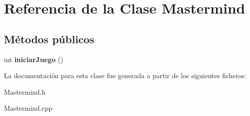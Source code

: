 \hypertarget{classMastermind}{\section{Referencia de la Clase Mastermind}
\label{classMastermind}
}
\subsection*{Métodos públicos}
\begin{DoxyCompactItemize}
\item 
\hypertarget{classMastermind_ab85ee5d13e86bb1a83f9e7f39c2240b8}{int {\bfseries iniciar\-Juego} ()}\label{classMastermind_ab85ee5d13e86bb1a83f9e7f39c2240b8}

\end{DoxyCompactItemize}


La documentación para esta clase fue generada a partir de los siguientes ficheros\-:\begin{DoxyCompactItemize}
\item 
Mastermind.\-h\item 
Mastermind.\-cpp\end{DoxyCompactItemize}
